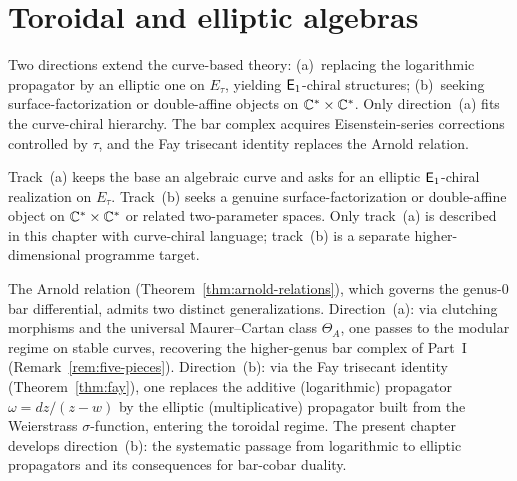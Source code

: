 
\chapter{Toroidal and elliptic algebras}
\label{chap:toroidal-elliptic}


Two directions extend the curve-based theory: (a)~replacing the logarithmic propagator by an elliptic one on $E_\tau$, yielding $\mathsf{E}_1$-chiral structures; (b)~seeking surface-factorization or double-affine objects on $\mathbb{C}^* \times \mathbb{C}^*$.  Only direction~(a) fits the curve-chiral hierarchy.  The bar complex acquires Eisenstein-series corrections controlled by $\tau$, and the Fay trisecant identity replaces the Arnold relation.

\begin{remark}
\label{rem:toroidal-two-tracks}
Track~(a) keeps the base an algebraic curve and asks for an elliptic
$\mathsf{E}_1$-chiral realization on $E_\tau$.  Track~(b) seeks a genuine
surface-factorization or double-affine object on
$\mathbb{C}^* \times \mathbb{C}^*$ or related two-parameter spaces.  Only
track~(a) is described in this chapter with curve-chiral language;
track~(b) is a separate higher-dimensional programme target.
\end{remark}

\begin{remark}
\label{rem:arnold-fay-generalization}
The Arnold relation (Theorem~\ref{thm:arnold-relations}), which governs the genus-$0$ bar differential, admits two distinct generalizations.  Direction~(a): via clutching morphisms and the universal Maurer--Cartan class $\Theta_A$, one passes to the modular regime on stable curves, recovering the higher-genus bar complex of Part~I (Remark~\ref{rem:five-pieces}).  Direction~(b): via the Fay trisecant identity (Theorem~\ref{thm:fay}), one replaces the additive (logarithmic) propagator $\omega = dz/(z-w)$ by the elliptic (multiplicative) propagator built from the Weierstrass $\sigma$-function, entering the toroidal regime.  The present chapter develops direction~(b): the systematic passage from logarithmic to elliptic propagators and its consequences for bar-cobar duality.
\end{remark}

